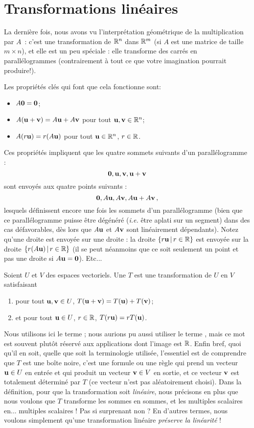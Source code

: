 \chapter{Transformations linéaires}
\label{chapter:Fr_29-lineartransformations}


La dernière fois, nous avons vu l'interprétation géométrique de la \og multiplication
par $A$\ \fg: c'est une transformation de $\mathbb{R}^n$ dans $\mathbb{R}^m$ (si $A$ est une matrice de taille $m\times n$), et elle est un peu spéciale : elle transforme des carrés en parallélogrammes (contrairement 
à tout ce que votre imagination pourrait produire!).

Les propriétés clés qui font que cela fonctionne sont:
\begin{itemize}
\item $A\mathbf{0} = \mathbf{0}$;
\item $A(\mathbf{u} + \mathbf{v}) = A\mathbf{u} + A\mathbf{v}$ pour tout $\mathbf{u},\mathbf{v} \in \mathbb{R}^n$;
\item $A(r\mathbf{u}) = r(A\mathbf{u})$ pour tout $\mathbf{u}\in\mathbb{R}^n$, $r\in\mathbb{R}$.
\end{itemize}
Ces propriétés impliquent que les quatre sommets suivants 
d'un parallélogramme :
$$
\mathbf{0}, \mathbf{u}, \mathbf{v}, \mathbf{u}+\mathbf{v}
$$
 sont
envoyés aux quatre points suivants :
$$
\mathbf{0}, A\mathbf{u}, A\mathbf{v}, A\mathbf{u} + A\mathbf{v}\,,
$$
lesquels définissent encore une fois les sommets d'un parallélogramme (bien que ce parallélogramme puisse \^etre
dégénéré (\textit{i.e.} être aplati sur un segment) dans des cas défavorables, dès lors que $A\mathbf{u}$ et $A\mathbf{v}$ sont linéairement dépendants). Notez qu'une droite est envoyée sur une droite :
la droite $\{r\mathbf{u}\,|\,r\in\mathbb{R}\}$ est envoyée sur la droite
$\{r(A\mathbf{u}) \,|\, r\in\mathbb{R}\}$ (il se peut néanmoins que ce soit seulement un point et pas une droite si $A\mathbf{u}=\mathbf{0}$). Etc...


\begin{definition}
Soient $U$ et $V$ des espaces vectoriels.  Une  $T$
est une transformation de $U$ en $V$ satisfaisant 
\begin{enumerate}[(1)]
\item pour tout $\mathbf{u},\mathbf{v}\in U$, $T(\mathbf{u}+\mathbf{v}) = T(\mathbf{u})+T(\mathbf{v})$;
\item et pour tout $\mathbf{u} \in U$, $r\in\mathbb{R}$, $T(r\mathbf{u}) = rT(\mathbf{u})$.
\end{enumerate}
\end{definition}

Nous utilisons ici le terme  ;
nous aurions pu aussi utiliser le terme , mais ce mot est souvent plutôt réservé aux applications dont l'image est $\mathbb{R}$. Enfin bref, quoi qu'il en soit, quelle que soit la terminologie utilisée,
l'essentiel est de comprendre que $T$ est une boîte noire, c'est une formule ou une règle qui
prend un vecteur $\mathbf{u}\in U$ en entrée et qui produit un vecteur $\mathbf{v}\in V$
en sortie, et ce vecteur $\mathbf{v}$ est totalement déterminé par $T$ (ce vecteur n'est pas aléatoirement choisi). Dans la définition, pour que la transformation soit \emph{linéaire}, nous précisons en plus que nous voulons que $T$ transforme les sommes en sommes, et les multiples scalaires en... multiples scalaires ! Pas si surprenant non ? En d'autres termes, nous voulons simplement qu'une transformation linéaire \emph{préserve la linéarité} !

